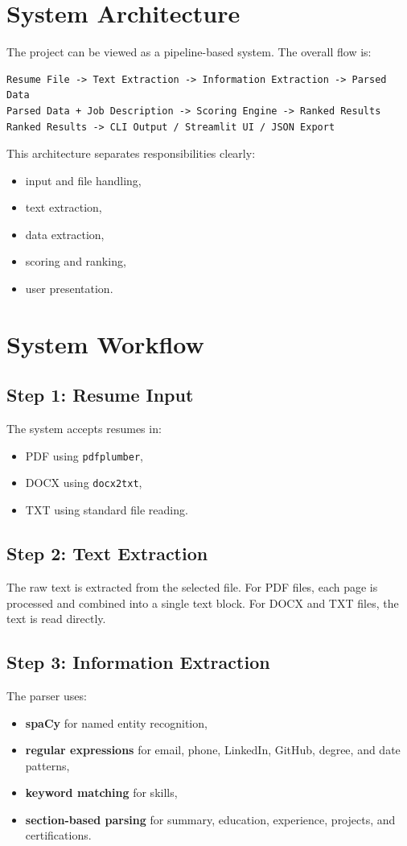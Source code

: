 \documentclass[12pt,a4paper]{article}
\begin{document}
\section{System Architecture}
The project can be viewed as a pipeline-based system. The overall flow is:

\begin{verbatim}
Resume File -> Text Extraction -> Information Extraction -> Parsed Data
Parsed Data + Job Description -> Scoring Engine -> Ranked Results
Ranked Results -> CLI Output / Streamlit UI / JSON Export
\end{verbatim}

This architecture separates responsibilities clearly:
\begin{itemize}[leftmargin=1.5em]
    \item input and file handling,
    \item text extraction,
    \item data extraction,
    \item scoring and ranking,
    \item user presentation.
\end{itemize}

\section{System Workflow}
\subsection{Step 1: Resume Input}
The system accepts resumes in:
\begin{itemize}[leftmargin=1.5em]
    \item PDF using \texttt{pdfplumber},
    \item DOCX using \texttt{docx2txt},
    \item TXT using standard file reading.
\end{itemize}

\subsection{Step 2: Text Extraction}
The raw text is extracted from the selected file. For PDF files, each page is processed and combined into a single text block. For DOCX and TXT files, the text is read directly.

\subsection{Step 3: Information Extraction}
The parser uses:
\begin{itemize}[leftmargin=1.5em]
    \item \textbf{spaCy} for named entity recognition,
    \item \textbf{regular expressions} for email, phone, LinkedIn, GitHub, degree, and date patterns,
    \item \textbf{keyword matching} for skills,
    \item \textbf{section-based parsing} for summary, education, experience, projects, and certifications.
\end{itemize}
\end{document}
